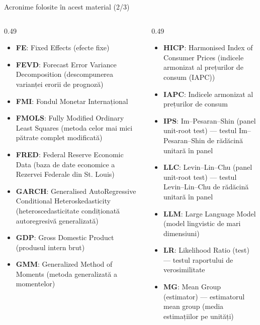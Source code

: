 \begin{frame}{Acronime folosite în acest material (2/3)}
\begin{columns}[T]
\begin{column}{0.49\textwidth}
\begin{itemize}\setlength{\itemsep}{0pt}
    \item \textbf{FE}: Fixed Effects (efecte fixe)
    \item \textbf{FEVD}: Forecast Error Variance Decomposition (descompunerea varianței erorii de prognoză)
    \item \textbf{FMI}: Fondul Monetar Internațional
    \item \textbf{FMOLS}: Fully Modified Ordinary Least Squares (metoda celor mai mici pătrate complet modificată)
    \item \textbf{FRED}: Federal Reserve Economic Data (baza de date economice a Rezervei Federale din St. Louis)
    \item \textbf{GARCH}: Generalised AutoRegressive Conditional Heteroskedasticity (heteroscedasticitate condiționată autoregresivă generalizată)
    \item \textbf{GDP}: Gross Domestic Product (produsul intern brut)
    \item \textbf{GMM}: Generalized Method of Moments (metoda generalizată a momentelor)
\end{itemize}
\end{column}
\begin{column}{0.49\textwidth}
\begin{itemize}\setlength{\itemsep}{0pt}
    \item \textbf{HICP}: Harmonised Index of Consumer Prices (indicele armonizat al prețurilor de consum (IAPC))
    \item \textbf{IAPC}: Indicele armonizat al prețurilor de consum
    \item \textbf{IPS}: Im–Pesaran–Shin (panel unit-root test) — testul Im–Pesaran–Shin de rădăcină unitară în panel
    \item \textbf{LLC}: Levin–Lin–Chu (panel unit-root test) — testul Levin–Lin–Chu de rădăcină unitară în panel
    \item \textbf{LLM}: Large Language Model (model lingvistic de mari dimensiuni)
    \item \textbf{LR}: Likelihood Ratio (test) — testul raportului de verosimilitate
    \item \textbf{MG}: Mean Group (estimator) — estimatorul mean group (media estimațiilor pe unități)
\end{itemize}
\end{column}
\end{columns}
\end{frame}
